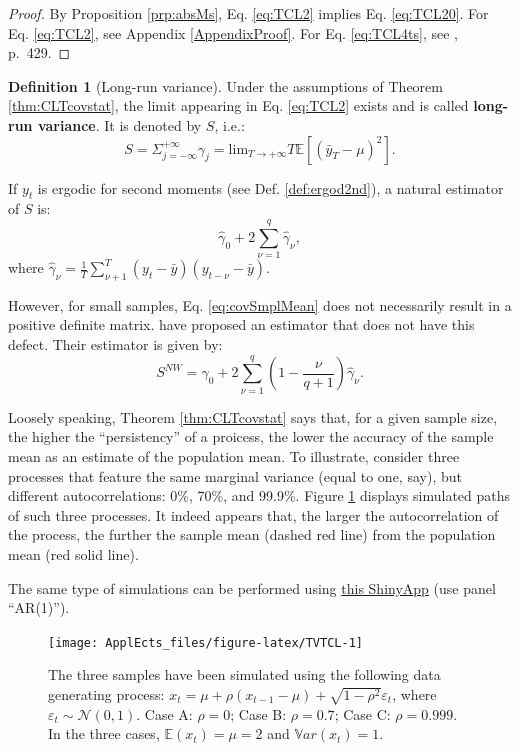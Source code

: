 \documentclass[
  12pt,
]{book}
\theoremstyle{definition}
\newtheorem{definition}{Definition}[chapter]
\theoremstyle{definition}
\theoremstyle{definition}
\theoremstyle{definition}
\theoremstyle{remark}
\begin{document}
\begin{proof}
By Proposition \ref{prp:absMs}, Eq. \eqref{eq:TCL2} implies Eq. \eqref{eq:TCL20}. For Eq. \eqref{eq:TCL2}, see Appendix \ref{AppendixProof}. For Eq. \eqref{eq:TCL4ts}, see \citet{Anderson_1971}, p.~429.
\end{proof}

\begin{definition}[Long-run variance]
\protect\hypertarget{def:LRV}{}\label{def:LRV}Under the assumptions of Theorem \ref{thm:CLTcovstat}, the limit appearing in Eq. \eqref{eq:TCL2} exists and is called \textbf{long-run variance}. It is denoted by \(S\), i.e.:
\[
S = \Sigma_{j=-\infty}^{+\infty} \gamma_j  = \mbox{lim}_{T \rightarrow +\infty} T \mathbb{E}[(\bar{y}_T - \mu)^2].
\]
\end{definition}

If \(y_t\) is ergodic for second moments (see Def. \ref{def:ergod2nd}), a natural estimator of \(S\) is:
\begin{equation}
\hat\gamma_0 + 2 \sum_{\nu=1}^{q} \hat\gamma_\nu, \label{eq:covSmplMean}
\end{equation}
where \(\hat\gamma_\nu = \frac{1}{T}\sum_{\nu+1}^{T} (y_t - \bar{y})(y_{t-\nu} - \bar{y})\).

However, for small samples, Eq. \eqref{eq:covSmplMean} does not necessarily result in a positive definite matrix. \citet{Newey_West_1987} have proposed an estimator that does not have this defect. Their estimator is given by:
\begin{equation}
S^{NW}=\hat\gamma_0 + 2 \sum_{\nu=1}^{q}\left(1-\frac{\nu}{q+1}\right) \hat\gamma_\nu.\label{eq:NWest}
\end{equation}

Loosely speaking, Theorem \ref{thm:CLTcovstat} says that, for a given sample size, the higher the ``persistency'' of a proicess, the lower the accuracy of the sample mean as an estimate of the population mean. To illustrate, consider three processes that feature the same marginal variance (equal to one, say), but different autocorrelations: 0\%, 70\%, and 99.9\%. Figure \ref{fig:TVTCL} displays simulated paths of such three processes. It indeed appears that, the larger the autocorrelation of the process, the further the sample mean (dashed red line) from the population mean (red solid line).

The same type of simulations can be performed using \href{https://jrenne.shinyapps.io/MacroEc/}{this ShinyApp} (use panel ``AR(1)'').

\begin{figure}
\texttt{[image: ApplEcts\_files/figure-latex/TVTCL-1]} \caption{The three samples have been simulated using the following data generating process: $x_t = \mu + \rho (x_{t-1}-\mu) + \sqrt{1-\rho^2}\varepsilon_t$, where $\varepsilon_t \sim \mathcal{N}(0,1)$. Case A: $\rho = 0$;  Case B: $\rho = 0.7$;  Case C: $\rho = 0.999$. In the three cases, $\mathbb{E}(x_t)=\mu=2$ and $\mathbb{V}ar(x_t)=1$.}\label{fig:TVTCL}
\end{figure}
\end{document}
